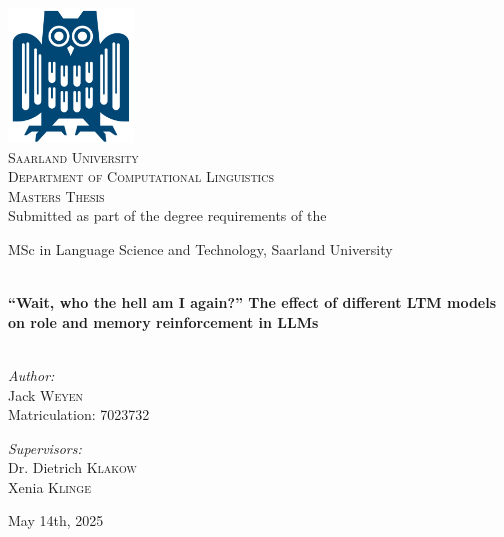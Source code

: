 \begin{titlepage}
\begin{center}

\includegraphics[width=0.25\textwidth]{images/uni-eule}~\\[1cm]

\textsc{\LARGE Saarland  University}\\[0.4cm]
\textsc{\Large Department of Computational Linguistics}\\[1.5cm]

\textsc{\Large Masters Thesis}\\[0.5cm]

Submitted as part of the degree requirements of the

MSc in Language Science and Technology, Saarland University

\HRule \\[1.0cm]
{ \huge \bfseries “Wait, who the hell am I again?”
The effect of different LTM models on
role and memory reinforcement in LLMs}\\[0.4cm]
\HRule \\[1.5cm]

\begin{minipage}{0.4\textwidth}
\begin{flushleft} \large
\emph{Author:}\\
Jack \textsc{Weyen}\\
Matriculation: 7023732
\end{flushleft}
\end{minipage}
\begin{minipage}{0.4\textwidth}
\begin{flushright} \large
\emph{Supervisors:} \\
Dr. Dietrich \textsc{Klakow}\\
Xenia \textsc{Klinge}\\
\end{flushright}
\end{minipage}

\vfill

{\large May 14th, 2025}

\end{center}
\end{titlepage}
